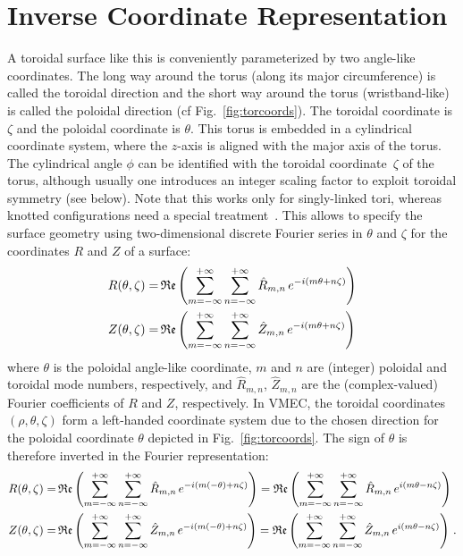\section{Inverse Coordinate Representation}
A toroidal surface like this is conveniently parameterized by two angle-like coordinates.
The long way around the torus (along its major circumference) is called the toroidal direction
and the short way around the torus (wristband-like) is called the poloidal direction (cf Fig.~\ref{fig:torcoords}).
The toroidal coordinate is $\zeta$ and the poloidal coordinate is $\theta$.
This torus is embedded in a cylindrical coordinate system,
where the $z$-axis is aligned with the major axis of the torus.
The cylindrical angle $\phi$ can be identified with the toroidal coordinate~$\zeta$ of the torus,
although usually one introduces an integer scaling factor to exploit toroidal symmetry (see below).
Note that this works only for singly-linked tori, whereas knotted configurations need a special treatment~\cite{hudson_knotatrons}.
This allows to specify the surface geometry using two-dimensional discrete Fourier series in $\theta$ and $\zeta$
for the coordinates $R$ and $Z$ of a surface:
\begin{align}
  R(\theta, \zeta) =&\, \mathfrak{Re} \left( \sum_{m=-\infty}^{+\infty} \sum_{n=-\infty}^{+\infty} \hat{R}_{m,n} \,e^{-i (m \theta + n \zeta)} \right) \nonumber \\
  Z(\theta, \zeta) =&\, \mathfrak{Re} \left( \sum_{m=-\infty}^{+\infty} \sum_{n=-\infty}^{+\infty} \hat{Z}_{m,n} \,e^{-i (m \theta + n \zeta)} \right) \nonumber
\end{align}
where $\theta$ is the poloidal angle-like coordinate, $m$ and $n$ are (integer) poloidal and toroidal mode numbers, respectively,
and $\hat{R}_{m,n}$, $\hat{Z}_{m,n}$ are the (complex-valued) Fourier coefficients of $R$ and $Z$, respectively.
In VMEC, the toroidal coordinates $(\rho, \theta, \zeta)$ form a left-handed coordinate system
due to the chosen direction for the poloidal coordinate $\theta$ depicted in Fig.~\ref{fig:torcoords}.
The sign of $\theta$ is therefore inverted in the Fourier representation:
\begin{align}
  R(\theta, \zeta) =&\, \mathfrak{Re} \left( \sum_{m=-\infty}^{+\infty} \sum_{n=-\infty}^{+\infty} \hat{R}_{m,n} \,e^{-i (m (-\theta) + n \zeta)} \right)
                   =    \mathfrak{Re} \left( \sum_{m=-\infty}^{+\infty} \sum_{n=-\infty}^{+\infty} \hat{R}_{m,n} \,e^{ i (m   \theta  - n \zeta)} \right) \label{eqn:R} \\
  Z(\theta, \zeta) =&\, \mathfrak{Re} \left( \sum_{m=-\infty}^{+\infty} \sum_{n=-\infty}^{+\infty} \hat{Z}_{m,n} \,e^{-i (m (-\theta) + n \zeta)} \right)
                   =    \mathfrak{Re} \left( \sum_{m=-\infty}^{+\infty} \sum_{n=-\infty}^{+\infty} \hat{Z}_{m,n} \,e^{ i (m   \theta  - n \zeta)} \right) \label{eqn:Z} \, .
\end{align}
